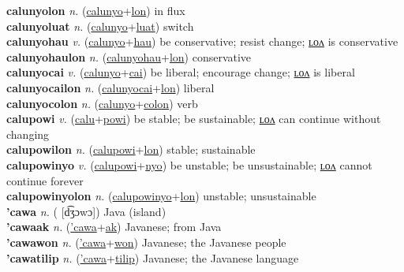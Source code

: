 \textbf{calunyolon} \textit{n.} (\hyperref[calunyo]{calunyo}+\hyperref[lon]{lon})
in flux \label{calunyolon} \\
\textbf{calunyoluat} \textit{n.} (\hyperref[calunyo]{calunyo}+\hyperref[luat]{luat})
switch \label{calunyoluat} \\
\textbf{calunyohau} \textit{v.} (\hyperref[calunyo]{calunyo}+\hyperref[hau]{hau})
be conservative; resist change; \hyperref[calunyohaulon]{ʟᴏᴧ} is conservative \label{calunyohau} \\
\textbf{calunyohaulon} \textit{n.} (\hyperref[calunyohau]{calunyohau}+\hyperref[lon]{lon})
conservative \label{calunyohaulon} \\
\textbf{calunyocai} \textit{v.} (\hyperref[calunyo]{calunyo}+\hyperref[cai]{cai})
be liberal; encourage change; \hyperref[calunyocailon]{ʟᴏᴧ} is liberal \label{calunyocai} \\
\textbf{calunyocailon} \textit{n.} (\hyperref[calunyocai]{calunyocai}+\hyperref[lon]{lon})
liberal \label{calunyocailon} \\
\textbf{calunyocolon} \textit{n.} (\hyperref[calunyo]{calunyo}+\hyperref[colon]{colon})
verb \label{calunyocolon} \\
\textbf{calupowi} \textit{v.} (\hyperref[calu]{calu}+\hyperref[powi]{powi})
be stable; be sustainable; \hyperref[calupowilon]{ʟᴏᴧ} can continue without changing \label{calupowi} \\
\textbf{calupowilon} \textit{n.} (\hyperref[calupowi]{calupowi}+\hyperref[lon]{lon})
stable; sustainable \label{calupowilon} \\
\textbf{calupowinyo} \textit{v.} (\hyperref[calupowi]{calupowi}+\hyperref[nyo]{nyo})
be unstable; be unsustainable; \hyperref[calupowinyolon]{ʟᴏᴧ} cannot continue forever \label{calupowinyo} \\
\textbf{calupowinyolon} \textit{n.} (\hyperref[calupowinyo]{calupowinyo}+\hyperref[lon]{lon})
unstable; unsustainable \label{calupowinyolon} \\
\textbf{'cawa} \textit{n.} ( [d͡ʒɔwɔ])
Java (island) \label{'cawa} \\
\textbf{'cawaak} \textit{n.} (\hyperref['cawa]{'cawa}+\hyperref[ak]{ak})
Javanese; from Java \label{'cawaak} \\
\textbf{'cawawon} \textit{n.} (\hyperref['cawa]{'cawa}+\hyperref[won]{won})
Javanese; the Javanese people \label{'cawawon} \\
\textbf{'cawatilip} \textit{n.} (\hyperref['cawa]{'cawa}+\hyperref[tilip]{tilip})
Javanese; the Javanese language \label{'cawatilip} \\
